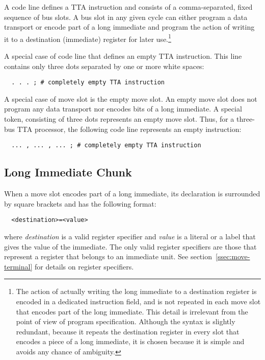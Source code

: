\documentclass[twoside]{tceusermanual}
\begin{document}
A code line defines a TTA instruction and consists of a comma-separated,
fixed sequence of bus slots.  A bus slot in any given cycle can either
program a data transport or encode part of a long immediate and program the
action of writing it to a destination (immediate) register for later
use.\footnote{
%
  The action of actually writing the long immediate to a destination
  register is encoded in a dedicated instruction field, and is not repeated
  in each move slot that encodes part of the long immediate.  This detail is
  irrelevant from the point of view of program specification.  Although the
  syntax is slightly redundant, because it repeats the destination register
  in every slot that encodes a piece of a long immediate, it is chosen
  because it is simple and avoids any chance of ambiguity.}

A special case of code line that defines an empty TTA instruction. This line
contains only three dots separated by one or more white spaces:
\begin{verbatim}
  . . . ; # completely empty TTA instruction
\end{verbatim}

A special case of move slot is the empty move slot. An empty move slot does
not program any data transport nor encodes bits of a long immediate. A
special token, consisting of three dots represents an empty move slot.
Thus, for a three-bus TTA processor, the following code line represents an
empty instruction:
\begin{verbatim}
  ... , ... , ... ; # completely empty TTA instruction
\end{verbatim}

\subsection{Long Immediate Chunk}

When a move slot encodes part of a long immediate, its declaration is
surrounded by square brackets and has the following format:

\begin{verbatim}
  <destination>=<value>
\end{verbatim}

where \emph{destination} is a valid register specifier and \emph{value} is a
literal or a label that gives the value of the immediate.  The only valid
register specifiers are those that represent a register that belongs to an
immediate unit.  See section~\ref{ssec:move-terminal} for details on
register specifiers.
\end{document}
